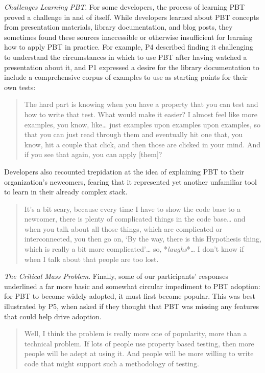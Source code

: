 \textit{Challenges Learning PBT}.
For some developers, the process of learning PBT proved a challenge in and of
itself.  While developers learned about PBT concepts from presentation
materials, library documentation, and blog posts, they sometimes found these
sources inaccessible or otherwise insufficient for learning how to apply PBT in practice.
For example, P4 described finding it challenging to understand the circumstances
in which to use PBT after having watched a presentation about it, and P1
expressed a desire for the library documentation to
include a comprehensive corpus of examples to use as starting points for their own tests:
\begin{quote}
  The hard part is knowing when you
  have a property that you can test and how to write that test. What
  would make it easier? I almost feel like more examples, you know,
  like\ldots{} just examples upon examples upon examples, so that you can just
  read through them and eventually hit one that, you know, hit a
  couple that click, and then those are clicked in your mind. And if you see
  that again, you can apply [them]?
\end{quote}

Developers also recounted trepidation at the idea of explaining PBT to
their organization's newcomers, fearing that it represented yet another unfamiliar
tool to learn in their already complex stack.
\begin{quote}
It's a bit scary, because every time I have to show the code base to a newcomer,
there is plenty of complicated things in the code base\ldots{} and when you
talk about all those things, which are complicated or interconnected, you
then go on, `By the way, there is this Hypothesis thing, which is really
a bit more complicated'\ldots{} so, *\emph{laughs}*\ldots{} I don't know if
when I talk about that people are too lost.
\end{quote}

\textit{The Critical Mass Problem}.
Finally, some of our participants' responses underlined a far more basic and
somewhat circular impediment to PBT adoption: for PBT to become widely adopted, it
must first become popular. This was best illustrated by P5,
when asked if they thought that PBT was missing any features that could help
drive adoption.
\begin{quote}
  Well, I think the problem is really more one of popularity, more than a
  technical problem. If lots of people use property based testing, then more
  people will be adept at using it.  And people will be more willing to write
  code that might support such a methodology of testing.
\end{quote}

